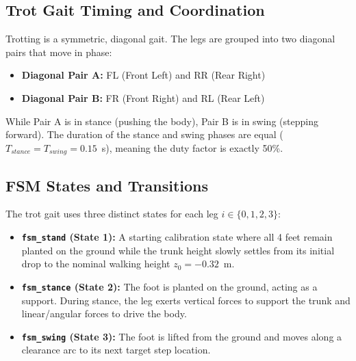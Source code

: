 \documentclass[11pt,a4paper]{article}
\begin{document}
\subsection{Trot Gait Timing and Coordination}
Trotting is a symmetric, diagonal gait. The legs are grouped into two diagonal pairs that move in phase:
\begin{itemize}
    \item \textbf{Diagonal Pair A:} FL (Front Left) and RR (Rear Right)
    \item \textbf{Diagonal Pair B:} FR (Front Right) and RL (Rear Left)
\end{itemize}
While Pair A is in stance (pushing the body), Pair B is in swing (stepping forward). The duration of the stance and swing phases are equal ($T_{stance} = T_{swing} = 0.15$~s), meaning the duty factor is exactly 50\%.

\subsection{FSM States and Transitions}
The trot gait uses three distinct states for each leg $i \in \{0, 1, 2, 3\}$:
\begin{itemize}
    \item \textbf{\texttt{fsm\_stand} (State 1):} A starting calibration state where all 4 feet remain planted on the ground while the trunk height slowly settles from its initial drop to the nominal walking height $z_0 = -0.32$~m.
    \item \textbf{\texttt{fsm\_stance} (State 2):} The foot is planted on the ground, acting as a support. During stance, the leg exerts vertical forces to support the trunk and linear/angular forces to drive the body.
    \item \textbf{\texttt{fsm\_swing} (State 3):} The foot is lifted from the ground and moves along a clearance arc to its next target step location.
\end{itemize}
\end{document}

